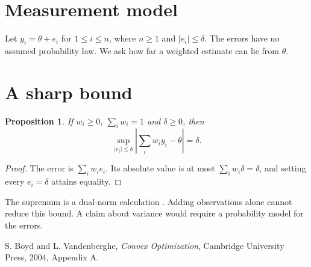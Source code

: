 \documentclass[11pt,a4paper]{amsart}
\title[Bounded error in a weighted mean]{\PraxisTitle}
\author{}\date{}
\newtheorem{proposition}[theorem]{Proposition}
\theoremstyle{definition}
\theoremstyle{remark}
\begin{document}
\begin{abstract}
Averaging measurements with a common deterministic error bound leaves
the worst-case error unchanged. For any nonnegative weights that sum to
one, the bound is attained when every error equals the common upper bound.
\end{abstract}
\maketitle
\section{Measurement model}
Let $y_i=\theta+e_i$ for $1\leq i\leq n$, where $n\geq1$ and
$|e_i|\leq\delta$. The errors have no assumed probability law.
We ask how far a weighted estimate can lie from $\theta$.
\section{A sharp bound}
\begin{proposition}
If $w_i\geq0$, $\sum_i w_i=1$ and $\delta\geq0$, then
\[
  \sup_{|e_i|\leq\delta}\left|\sum_i w_i y_i-\theta\right|=\delta .
\]
\end{proposition}
\begin{proof}
The error is $\sum_i w_i e_i$. Its absolute value is at most
$\sum_i w_i\delta=\delta$, and setting every $e_i=\delta$ attains equality.
\end{proof}
The supremum is a dual-norm calculation \cite{bv}. Adding observations
alone cannot reduce this bound. A claim about variance would require a
probability model for the errors.
\begin{thebibliography}{1}
 S. Boyd and L. Vandenberghe, \emph{Convex Optimization},
Cambridge University Press, 2004, Appendix A.
\end{thebibliography}
\end{document}
